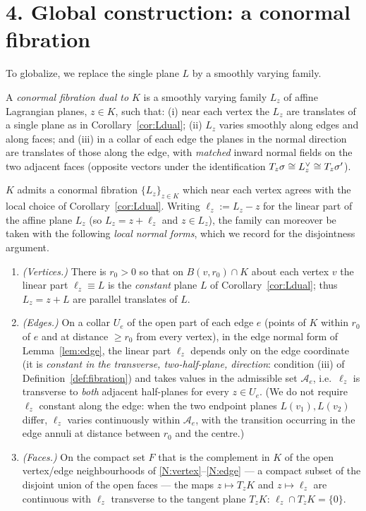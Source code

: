 \section*{4. Global construction: a conormal fibration}

To globalize, we replace the single plane $L$ by a smoothly varying family.

\begin{qeightdefinition}\label{def:fibration}
A \emph{conormal fibration dual to $K$} is a smoothly varying family $L_z$ of
affine Lagrangian planes, $z\in K$, such that: (i) near each vertex the $L_z$ are
translates of a single plane as in Corollary~\ref{cor:Ldual}; (ii) $L_z$ varies
smoothly along edges and along faces; and (iii) in a collar of each edge the
planes in the normal direction are translates of those along the edge, with
\emph{matched} inward normal fields on the two adjacent faces (opposite vectors
under the identification $T_z\sigma\cong L^{\vee}_z\cong T_z\sigma'$).
\end{qeightdefinition}

\begin{qeightlemma}\label{lem:fibexists}
$K$ admits a conormal fibration $\{L_z\}_{z\in K}$ which near each vertex agrees
with the local choice of Corollary~\ref{cor:Ldual}. Writing $\ell_z:=L_z-z$ for the
linear part of the affine plane $L_z$ (so $L_z=z+\ell_z$ and $z\in L_z$), the family
can moreover be taken with the following \emph{local normal forms}, which we record
for the disjointness argument.
\begin{enumerate}[label=\textup{(N\arabic*)}]
\item\label{N:vertex} \emph{(Vertices.)} There is $r_0>0$ so that on
$B(v,r_0)\cap K$ about each vertex $v$ the linear part $\ell_z\equiv L$ is the
\emph{constant} plane $L$ of Corollary~\ref{cor:Ldual}; thus $L_z=z+L$ are parallel
translates of $L$.
\item\label{N:edge} \emph{(Edges.)} On a collar $U_e$ of the open part of each edge
$e$ (points of $K$ within $r_0$ of $e$ and at distance $\ge r_0$ from every vertex),
in the edge normal form of Lemma~\ref{lem:edge}, the linear part $\ell_z$ depends only
on the edge coordinate (it is \emph{constant in the transverse, two-half-plane,
direction}: condition (iii) of Definition~\ref{def:fibration}) and takes values in the
admissible set $\mathcal A_e$, i.e.\ $\ell_z$ is transverse to \emph{both} adjacent
half-planes for every $z\in U_e$. (We do not require $\ell_z$ constant along the edge:
when the two endpoint planes $L(v_1),L(v_2)$ differ, $\ell_z$ varies continuously
within $\mathcal A_e$, with the transition occurring in the edge annuli at distance
between $r_0$ and the centre.)
\item\label{N:face} \emph{(Faces.)} On the compact set $F$ that is the complement in
$K$ of the open vertex/edge neighbourhoods of \ref{N:vertex}--\ref{N:edge} --- a
compact subset of the disjoint union of the open faces --- the maps $z\mapsto T_zK$
and $z\mapsto\ell_z$ are continuous with $\ell_z$ transverse to the tangent plane
$T_zK$: $\ell_z\cap T_zK=\{0\}$.
\end{enumerate}
\end{qeightlemma}

